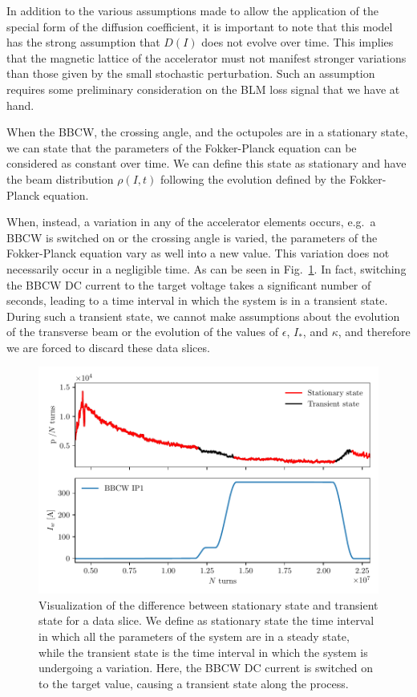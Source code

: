 In addition to the various assumptions made to allow the application of the special form of the diffusion coefficient, it is important to note that this model has the strong assumption that $D(I)$ does not evolve over time. This implies that the magnetic lattice of the accelerator must not manifest stronger variations than those given by the small stochastic perturbation. Such an assumption requires some preliminary consideration on the BLM loss signal that we have at hand.

When the BBCW, the crossing angle, and the octupoles are in a stationary state, we can state that the parameters of the Fokker-Planck equation can be considered as constant over time. We can define this state as stationary and have the beam distribution $\rho(I, t)$ following the evolution defined by the Fokker-Planck equation.

When, instead, a variation in any of the accelerator elements occurs, e.g.\ a BBCW is switched on or the crossing angle is varied, the parameters of the Fokker-Planck equation vary as well into a new value. This variation does not necessarily occur in a negligible time. As can be seen in Fig.~\ref{fig:transient-state}. In fact, switching the BBCW DC current to the target voltage takes a significant number of seconds, leading to a time interval in which the system is in a transient state. During such a transient state, we cannot make assumptions about the evolution of the transverse beam or the evolution of the values of $\epsilon$, $I_\ast$, and $\kappa$, and therefore we are forced to discard these data slices.

\begin{figure}[hpt]
    \centering
    \includegraphics[width=1.0\textwidth]{5_wire_compensators_LHC/figs/stationary_transient.pdf}
    \caption{Visualization of the difference between stationary state and transient state for a data slice. We define as stationary state the time interval in which all the parameters of the system are in a steady state, while the transient state is the time interval in which the system is undergoing a variation. Here, the BBCW DC current is switched on to the target value, causing a transient state along the process.}
    \label{fig:transient-state}
\end{figure}

